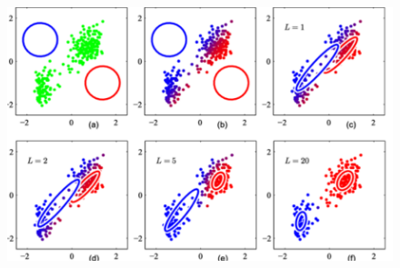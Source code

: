 \begin{figure}[!h]
    \includegraphics[width = \columnwidth]{figures/GenAI1/EMAlgorithem.png}
\end{figure}
